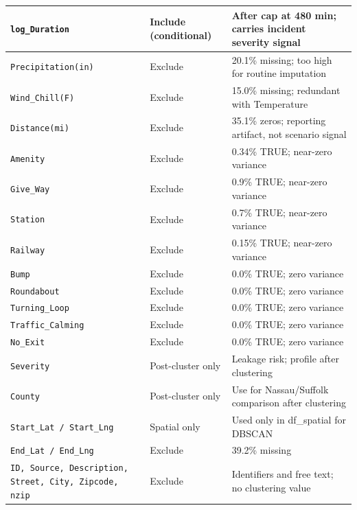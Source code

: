 \documentclass[11pt]{article}
\begin{document}
\begin{longtable}{|p{4cm}|p{2.5cm}|p{7cm}|}
\hline
\texttt{log\_Duration} & Include (conditional) & After cap at 480 min; carries incident severity signal \\
\hline
\texttt{Precipitation(in)} & Exclude & 20.1\% missing; too high for routine imputation \\
\hline
\texttt{Wind\_Chill(F)} & Exclude & 15.0\% missing; redundant with Temperature \\
\hline
\texttt{Distance(mi)} & Exclude & 35.1\% zeros; reporting artifact, not scenario signal \\
\hline
\texttt{Amenity} & Exclude & 0.34\% TRUE; near-zero variance \\
\hline
\texttt{Give\_Way} & Exclude & 0.9\% TRUE; near-zero variance \\
\hline
\texttt{Station} & Exclude & 0.7\% TRUE; near-zero variance \\
\hline
\texttt{Railway} & Exclude & 0.15\% TRUE; near-zero variance \\
\hline
\texttt{Bump} & Exclude & 0.0\% TRUE; zero variance \\
\hline
\texttt{Roundabout} & Exclude & 0.0\% TRUE; zero variance \\
\hline
\texttt{Turning\_Loop} & Exclude & 0.0\% TRUE; zero variance \\
\hline
\texttt{Traffic\_Calming} & Exclude & 0.0\% TRUE; zero variance \\
\hline
\texttt{No\_Exit} & Exclude & 0.0\% TRUE; zero variance \\
\hline
\texttt{Severity} & Post-cluster only & Leakage risk; profile after clustering \\
\hline
\texttt{County} & Post-cluster only & Use for Nassau/Suffolk comparison after clustering \\
\hline
\texttt{Start\_Lat / Start\_Lng} & Spatial only & Used only in df\_spatial for DBSCAN \\
\hline
\texttt{End\_Lat / End\_Lng} & Exclude & 39.2\% missing \\
\hline
\texttt{ID, Source, Description, Street, City, Zipcode, nzip} & Exclude & Identifiers and free text; no clustering value \\
\hline
\end{longtable}
\end{document}
